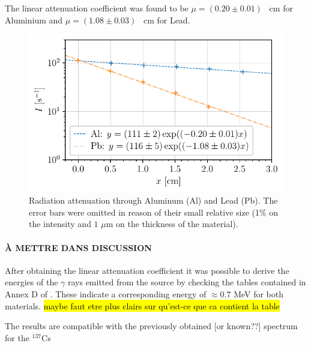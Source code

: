 The linear attenuation coefficient was found to be $\mu = (0.20 \pm 0.01)$ \unit{\per\cm} for Aluminium
and $\mu = (1.08 \pm 0.03)$ \unit{\per\cm} for Lead.
\begin{figure}[htbp]
    \centering
    \includegraphics[scale=1]{figures/attenuation_coefficient.pdf}
    \caption{Radiation attenuation through Aluminum (Al) and Lead (Pb). 
             The error bars were omitted in reason of their small relative size 
             (1\% on the intensity and $1$ $\mu$m on the thickness of the material).}
    \label{fig:attenuation_coefficient}
\end{figure}

\paragraph{À METTRE DANS DISCUSSION}
After obtaining the linear attenuation coefficient it was possible to derive the energies of the $\gamma$ rays emitted from the source by checking the tables contained in Annex D of \cite{notice_generale}.
These indicate a corresponding energy of $\approx 0.7$ MeV for both materials.
\hl{maybe faut etre plus clairs sur qu'est-ce que ca contient la table}

The results are compatible with the previously obtained [or known??] spectrum for the $^{137}$Cs